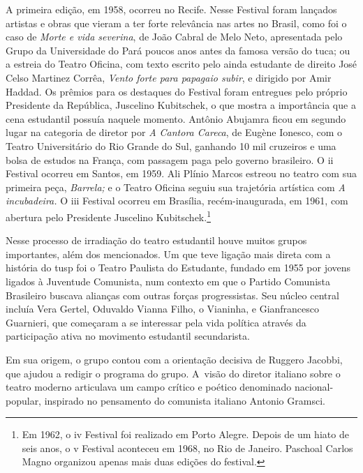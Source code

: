 A primeira edição, em 1958, ocorreu no Recife. Nesse Festival foram
lançados artistas e obras que vieram a ter forte relevância nas artes no
Brasil, como foi o caso de {\it Morte e vida severina}, de João Cabral
de Melo Neto, apresentada pelo Grupo da Universidade do Pará poucos anos
antes da famosa versão do {\sc tuca}; ou a estreia do Teatro Oficina, com
texto escrito pelo ainda estudante de direito José Celso Martinez
Corrêa, {\it Vento forte para papagaio subir}, e dirigido por Amir
Haddad. Os prêmios para os destaques do Festival foram entregues pelo
próprio Presidente da República, Juscelino Kubitschek, o que mostra a
importância que a cena estudantil possuía naquele momento. Antônio
Abujamra ficou em segundo lugar na categoria de diretor por {\it A
Cantora Careca}, de Eugène Ionesco, com o Teatro Universitário do Rio
Grande do Sul, ganhando 10 mil cruzeiros e uma bolsa de estudos na
França, com passagem paga pelo governo brasileiro. O {\sc ii} Festival ocorreu
em Santos, em 1959. Ali Plínio Marcos estreou no teatro com sua primeira
peça, {\it Barrela;} e o Teatro Oficina seguiu sua trajetória artística
com {\it A incubadeira.} O {\sc iii} Festival ocorreu em Brasília,
recém-inaugurada, em 1961, com abertura pelo Presidente Juscelino
Kubitschek.\footnote{Em 1962, o {\sc iv} Festival foi realizado em Porto
  Alegre. Depois de um hiato de seis anos, o {\sc v} Festival aconteceu em
  1968, no Rio de Janeiro. Paschoal Carlos Magno organizou apenas mais
  duas edições do festival.}

\subject{Estudantes e a ideia de nacional-popular: Teatro Paulista do
Estudante}

Nesse processo de irradiação do teatro estudantil houve muitos grupos
importantes, além dos mencionados. Um que teve ligação mais direta com a
história do {\sc tusp} foi o Teatro Paulista do Estudante, fundado em 1955 por
jovens ligados à Juventude Comunista, num contexto em que o Partido
Comunista Brasileiro buscava alianças com outras forças progressistas.
Seu núcleo central incluía Vera Gertel, Oduvaldo Vianna Filho, o
Vianinha, e Gianfrancesco Guarnieri, que começaram a se interessar pela
vida política através da participação ativa no movimento estudantil
secundarista.

Em sua origem, o grupo contou com a orientação decisiva de Ruggero
Jacobbi, que ajudou a redigir o programa do grupo. A~visão do diretor
italiano sobre o teatro moderno articulava um campo crítico e poético
denominado nacional-popular, inspirado no pensamento do comunista
italiano Antonio Gramsci.

